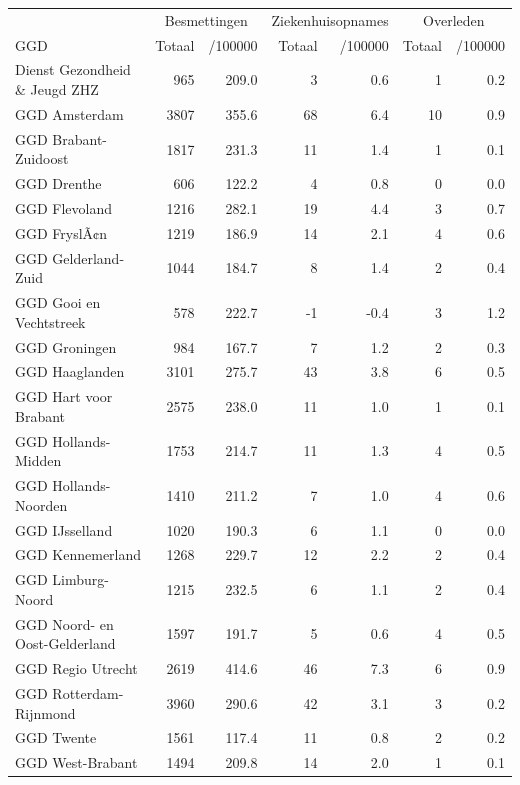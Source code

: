 \documentclass[
  english,
  man,floatsintext]{apa6}
\begin{document}
\begin{table}
\centering\begingroup\fontsize{10}{12}\selectfont

\begin{threeparttable}
\begin{tabular}{lrrrrrr}
\toprule
\multicolumn{1}{c}{ } & \multicolumn{2}{c}{Besmettingen} & \multicolumn{2}{c}{Ziekenhuisopnames} & \multicolumn{2}{c}{Overleden} \\
\cmidrule(l{3pt}r{3pt}){2-3} \cmidrule(l{3pt}r{3pt}){4-5} \cmidrule(l{3pt}r{3pt}){6-7}
GGD & Totaal & /100000 & Totaal & /100000 & Totaal & /100000\\
\midrule
Dienst Gezondheid \& Jeugd ZHZ & 965 & 209.0 & 3 & 0.6 & 1 & 0.2\\
GGD Amsterdam & 3807 & 355.6 & 68 & 6.4 & 10 & 0.9\\
GGD Brabant-Zuidoost & 1817 & 231.3 & 11 & 1.4 & 1 & 0.1\\
GGD Drenthe & 606 & 122.2 & 4 & 0.8 & 0 & 0.0\\
GGD Flevoland & 1216 & 282.1 & 19 & 4.4 & 3 & 0.7\\
GGD FryslÃ¢n & 1219 & 186.9 & 14 & 2.1 & 4 & 0.6\\
GGD Gelderland-Zuid & 1044 & 184.7 & 8 & 1.4 & 2 & 0.4\\
GGD Gooi en Vechtstreek & 578 & 222.7 & -1 & -0.4 & 3 & 1.2\\
GGD Groningen & 984 & 167.7 & 7 & 1.2 & 2 & 0.3\\
GGD Haaglanden & 3101 & 275.7 & 43 & 3.8 & 6 & 0.5\\
GGD Hart voor Brabant & 2575 & 238.0 & 11 & 1.0 & 1 & 0.1\\
GGD Hollands-Midden & 1753 & 214.7 & 11 & 1.3 & 4 & 0.5\\
GGD Hollands-Noorden & 1410 & 211.2 & 7 & 1.0 & 4 & 0.6\\
GGD IJsselland & 1020 & 190.3 & 6 & 1.1 & 0 & 0.0\\
GGD Kennemerland & 1268 & 229.7 & 12 & 2.2 & 2 & 0.4\\
GGD Limburg-Noord & 1215 & 232.5 & 6 & 1.1 & 2 & 0.4\\
GGD Noord- en Oost-Gelderland & 1597 & 191.7 & 5 & 0.6 & 4 & 0.5\\
GGD Regio Utrecht & 2619 & 414.6 & 46 & 7.3 & 6 & 0.9\\
GGD Rotterdam-Rijnmond & 3960 & 290.6 & 42 & 3.1 & 3 & 0.2\\
GGD Twente & 1561 & 117.4 & 11 & 0.8 & 2 & 0.2\\
GGD West-Brabant & 1494 & 209.8 & 14 & 2.0 & 1 & 0.1\\

\end{tabular}
\end{threeparttable}
\end{table}
\end{document}
